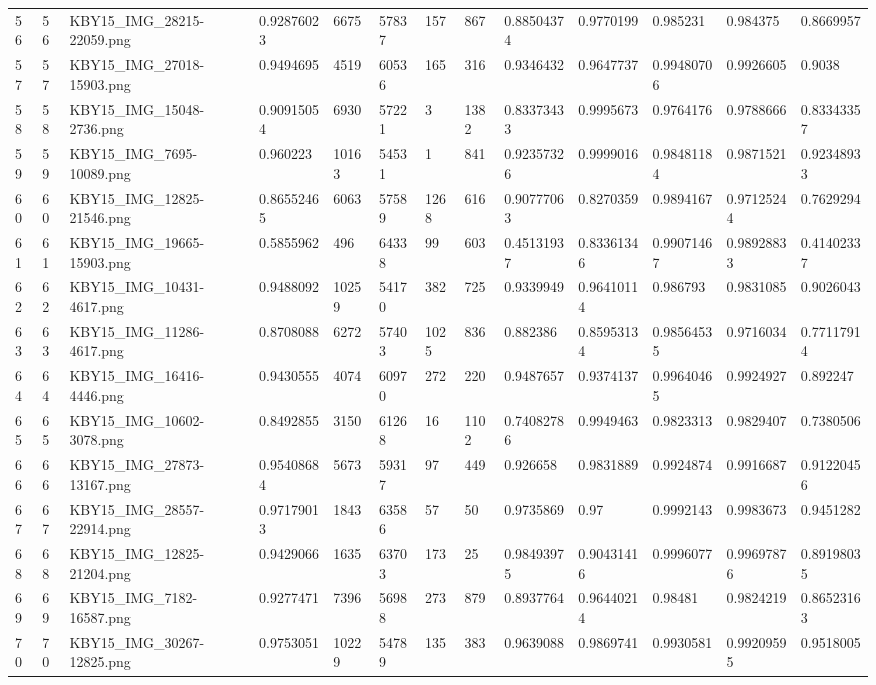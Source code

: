 \documentclass[11pt, a4paper, twoside]{report}
\begin{document}
\begin{longtable}[c]{@{}lllllllllllll@{}}
56 & 56 & KBY15\_IMG\_28215-22059.png & 0.92876023 & 6675 & 57837 & 157 & 867 & 0.88504374 & 0.9770199 & 0.985231 & 0.984375 & 0.8669957 \\
57 & 57 & KBY15\_IMG\_27018-15903.png & 0.9494695 & 4519 & 60536 & 165 & 316 & 0.9346432 & 0.9647737 & 0.99480706 & 0.9926605 & 0.9038 \\
58 & 58 & KBY15\_IMG\_15048-2736.png & 0.90915054 & 6930 & 57221 & 3 & 1382 & 0.83373433 & 0.9995673 & 0.9764176 & 0.9788666 & 0.83343357 \\
59 & 59 & KBY15\_IMG\_7695-10089.png & 0.960223 & 10163 & 54531 & 1 & 841 & 0.92357326 & 0.9999016 & 0.98481184 & 0.9871521 & 0.92348933 \\
60 & 60 & KBY15\_IMG\_12825-21546.png & 0.86552465 & 6063 & 57589 & 1268 & 616 & 0.90777063 & 0.8270359 & 0.9894167 & 0.97125244 & 0.7629294 \\
61 & 61 & KBY15\_IMG\_19665-15903.png & 0.5855962 & 496 & 64338 & 99 & 603 & 0.45131937 & 0.83361346 & 0.99071467 & 0.98928833 & 0.41402337 \\
62 & 62 & KBY15\_IMG\_10431-4617.png & 0.9488092 & 10259 & 54170 & 382 & 725 & 0.9339949 & 0.96410114 & 0.986793 & 0.9831085 & 0.9026043 \\
63 & 63 & KBY15\_IMG\_11286-4617.png & 0.8708088 & 6272 & 57403 & 1025 & 836 & 0.882386 & 0.85953134 & 0.98564535 & 0.9716034 & 0.77117914 \\
64 & 64 & KBY15\_IMG\_16416-4446.png & 0.9430555 & 4074 & 60970 & 272 & 220 & 0.9487657 & 0.9374137 & 0.99640465 & 0.9924927 & 0.892247 \\
65 & 65 & KBY15\_IMG\_10602-3078.png & 0.8492855 & 3150 & 61268 & 16 & 1102 & 0.74082786 & 0.9949463 & 0.9823313 & 0.9829407 & 0.7380506 \\
66 & 66 & KBY15\_IMG\_27873-13167.png & 0.95408684 & 5673 & 59317 & 97 & 449 & 0.926658 & 0.9831889 & 0.9924874 & 0.9916687 & 0.91220456 \\
67 & 67 & KBY15\_IMG\_28557-22914.png & 0.97179013 & 1843 & 63586 & 57 & 50 & 0.9735869 & 0.97 & 0.9992143 & 0.9983673 & 0.9451282 \\
68 & 68 & KBY15\_IMG\_12825-21204.png & 0.9429066 & 1635 & 63703 & 173 & 25 & 0.98493975 & 0.90431416 & 0.9996077 & 0.99697876 & 0.89198035 \\
69 & 69 & KBY15\_IMG\_7182-16587.png & 0.9277471 & 7396 & 56988 & 273 & 879 & 0.8937764 & 0.96440214 & 0.98481 & 0.9824219 & 0.86523163 \\
70 & 70 & KBY15\_IMG\_30267-12825.png & 0.9753051 & 10229 & 54789 & 135 & 383 & 0.9639088 & 0.9869741 & 0.9930581 & 0.99209595 & 0.9518005 \\

\end{longtable}
\end{document}
